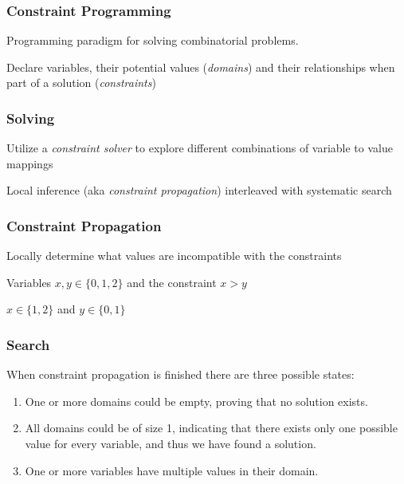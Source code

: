 \begin{frame}
	\frametitle{Constraint Programming}

	Programming paradigm for solving combinatorial problems.

	\vspace{0.5cm}

	Declare variables, their potential values (\textit{domains}) and their relationships when
	part of a solution (\textit{constraints})

\end{frame}

\begin{frame}
	\frametitle{Solving}

	Utilize a \textit{constraint solver} to explore different combinations of variable to
	value mappings

	\vspace{0.5cm}

	Local inference (aka \textit{constraint propagation}) interleaved with systematic search \cite{handbook-constraint-programming}

\end{frame}

\begin{frame}
	\frametitle{Constraint Propagation}
	Locally determine what values are incompatible with the constraints

	\vspace{0.5cm}

	Variables $x,y \in \{0,1,2\}$ and the constraint $x > y$

	\vspace{0.5cm}

	$x \in \{1,2\}$ and $y \in \{0,1\}$
\end{frame}

\begin{frame}
	\frametitle{Search}

	When constraint propagation is finished there are three possible states:

	\vspace{0.5cm}

	\begin{enumerate}
		\item One or more domains could be empty, proving that no solution exists.
		\item	All domains could be of size 1, indicating that there exists only one possible value for every variable, and thus we have found a solution.
		\item One or more variables have multiple values in their domain.
	\end{enumerate}

\end{frame}

